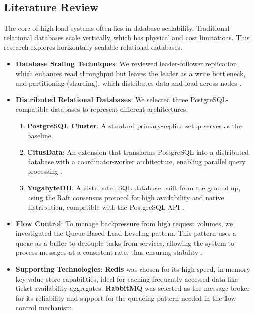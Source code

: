 \subsection{Literature Review}
The core of high-load systems often lies in database scalability. Traditional relational databases scale vertically, which has physical and cost limitations. This research explores horizontally scalable relational databases.
\begin{itemize}
    \item \textbf{Database Scaling Techniques}: We reviewed leader-follower replication, which enhances read throughput but leaves the leader as a write bottleneck, and partitioning (sharding), which distributes data and load across nodes \cite{dataIntensiveApplications}.
    \item \textbf{Distributed Relational Databases}: We selected three PostgreSQL-compatible databases to represent different architectures:
          \begin{enumerate}
              \item \textbf{PostgreSQL Cluster}: A standard primary-replica setup serves as the baseline.
              \item \textbf{CitusData}: An extension that transforms PostgreSQL into a distributed database with a coordinator-worker architecture, enabling parallel query processing \cite{citus}.
              \item \textbf{YugabyteDB}: A distributed SQL database built from the ground up, using the Raft consensus protocol for high availability and native distribution, compatible with the PostgreSQL API \cite{yugabyteBaeldung}.
          \end{enumerate}
    \item \textbf{Flow Control}: To manage backpressure from high request volumes, we investigated the Queue-Based Load Leveling pattern. This pattern uses a queue as a buffer to decouple tasks from services, allowing the system to process messages at a consistent rate, thus ensuring stability \cite{queueLoadLeveling}.
    \item \textbf{Supporting Technologies}: \textbf{Redis} was chosen for its high-speed, in-memory key-value store capabilities, ideal for caching frequently accessed data like ticket availability aggregates. \textbf{RabbitMQ} was selected as the message broker for its reliability and support for the queueing pattern needed in the flow control mechanism.
\end{itemize}

